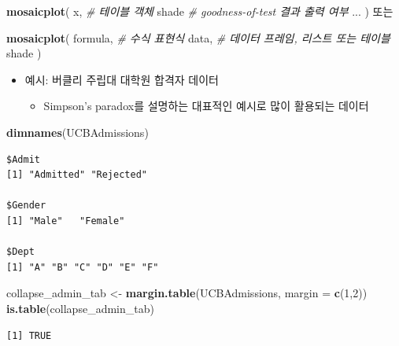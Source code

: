 \documentclass[
  11pt,
]{krantz}
\newenvironment{Shaded}{\begin{snugshade}}{\end{snugshade}}
\newcommand{\CommentTok}[1]{\textcolor[rgb]{0.37,0.37,0.37}{\textit{#1}}}
\newcommand{\DataTypeTok}[1]{\textcolor[rgb]{0.27,0.27,0.27}{#1}}
\newcommand{\DecValTok}[1]{\textcolor[rgb]{0.06,0.06,0.06}{#1}}
\newcommand{\KeywordTok}[1]{\textcolor[rgb]{0.27,0.27,0.27}{\textbf{#1}}}
\newcommand{\NormalTok}[1]{#1}
\newcommand{\StringTok}[1]{\textcolor[rgb]{0.5,0.5,0.5}{#1}}
\providecommand{\tightlist}{%
  \setlength{\itemsep}{0pt}\setlength{\parskip}{0pt}}
\begin{document}
\footnotesize

\begin{Shaded}
\begin{Highlighting}[]
\KeywordTok{mosaicplot}\NormalTok{(}
\NormalTok{  x, }\CommentTok{# 테이블 객체}
\NormalTok{  shade }\CommentTok{# goodness-of-test 결과 출력 여부}
\NormalTok{  ... }
\NormalTok{) }
\NormalTok{또는}

\KeywordTok{mosaicplot}\NormalTok{(}
\NormalTok{  formula, }\CommentTok{# 수식 표현식}
\NormalTok{  data, }\CommentTok{# 데이터 프레임, 리스트 또는 테이블 }
\NormalTok{  shade }
\NormalTok{)}
\end{Highlighting}
\end{Shaded}

\normalsize

\begin{itemize}
\tightlist
\item
  예시: 버클리 주립대 대학원 합격자 데이터

  \begin{itemize}
  \tightlist
  \item
    Simpson's paradox를 설명하는 대표적인 예시로 많이 활용되는 데이터
  \end{itemize}
\end{itemize}

\footnotesize

\begin{Shaded}
\begin{Highlighting}[]
\KeywordTok{dimnames}\NormalTok{(UCBAdmissions)}
\end{Highlighting}
\end{Shaded}

\begin{verbatim}
$Admit
[1] "Admitted" "Rejected"

$Gender
[1] "Male"   "Female"

$Dept
[1] "A" "B" "C" "D" "E" "F"
\end{verbatim}

\begin{Shaded}
\begin{Highlighting}[]
\NormalTok{collapse_admin_tab <-}\StringTok{ }\KeywordTok{margin.table}\NormalTok{(UCBAdmissions, }\DataTypeTok{margin =} \KeywordTok{c}\NormalTok{(}\DecValTok{1}\NormalTok{,}\DecValTok{2}\NormalTok{))}
\KeywordTok{is.table}\NormalTok{(collapse_admin_tab)}
\end{Highlighting}
\end{Shaded}

\begin{verbatim}
[1] TRUE
\end{verbatim}
\end{document}
